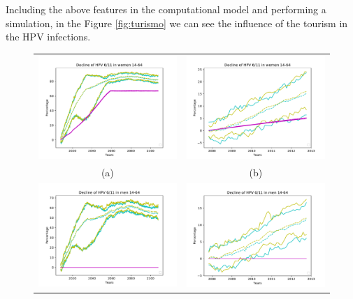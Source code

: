Including the above features in the computational model and performing a simulation, in the Figure \ref{fig:turismo} we can see the influence of the tourism in the HPV infections.

\begin{figure}[!]
	\centering
	\begin{tabular}{cc}
		\includegraphics[width=0.5\linewidth]{IMGs/8.-Turismo/verr_muj.pdf}	& 
		\includegraphics[width=0.5\linewidth]{IMGs/8.-Turismo/verr_muj_ZOOM.pdf}  \\ 
		(a)	& (b) \\ 
		\includegraphics[width=0.5\linewidth]{IMGs/8.-Turismo/verr_hom.pdf}	& 
		\includegraphics[width=0.5\linewidth]{IMGs/8.-Turismo/verr_hom_ZOOM.pdf}  \\ 

\end{tabular}
\end{figure}
